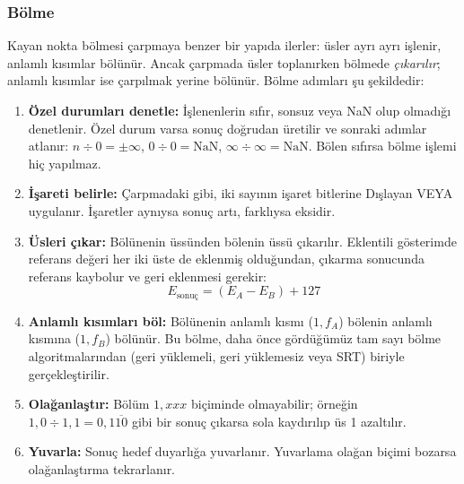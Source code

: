 \subsubsection{Bölme}

Kayan nokta bölmesi çarpmaya benzer bir yapıda ilerler: üsler ayrı ayrı işlenir, anlamlı kısımlar bölünür. Ancak çarpmada üsler toplanırken bölmede \emph{çıkarılır}; anlamlı kısımlar ise çarpılmak yerine bölünür. Bölme adımları şu şekildedir:

\begin{enumerate}
\item \textbf{Özel durumları denetle:} İşlenenlerin sıfır, sonsuz veya NaN olup olmadığı denetlenir. Özel durum varsa sonuç doğrudan üretilir ve sonraki adımlar atlanır: $n \div 0 = \pm\infty$, $0 \div 0 = \text{NaN}$, $\infty \div \infty = \text{NaN}$. Bölen sıfırsa bölme işlemi hiç yapılmaz.

\item \textbf{İşareti belirle:} Çarpmadaki gibi, iki sayının işaret bitlerine Dışlayan VEYA uygulanır. İşaretler aynıysa sonuç artı, farklıysa eksidir.

\item \textbf{Üsleri çıkar:} Bölünenin üssünden bölenin üssü çıkarılır. Eklentili gösterimde referans değeri her iki üste de eklenmiş olduğundan, çıkarma sonucunda referans kaybolur ve geri eklenmesi gerekir:
\[
E_\text{sonuç} = (E_A - E_B) + 127
\]

\item \textbf{Anlamlı kısımları böl:} Bölünenin anlamlı kısmı ($1{,}f_A$) bölenin anlamlı kısmına ($1{,}f_B$) bölünür. Bu bölme, daha önce gördüğümüz tam sayı bölme algoritmalarından (geri yüklemeli, geri yüklemesiz veya SRT) biriyle gerçekleştirilir.

\item \textbf{Olağanlaştır:} Bölüm $1{,}xxx$ biçiminde olmayabilir; örneğin $1{,}0 \div 1{,}1 = 0{,}1\overline{10}$ gibi bir sonuç çıkarsa sola kaydırılıp üs 1 azaltılır.

\item \textbf{Yuvarla:} Sonuç hedef duyarlığa yuvarlanır. Yuvarlama olağan biçimi bozarsa olağanlaştırma tekrarlanır.
\end{enumerate}

